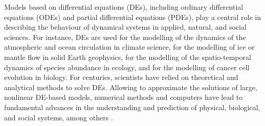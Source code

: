 Models based on differential equations (DEs), including ordinary differential equations (ODEs) and partial differential equations (PDEs), play a central role in describing the behaviour of dynamical systems in applied, natural, and social sciences.
For instance, DEs are used for the modelling of the dynamics of the atmospheric and ocean circulation in climate science, for the modelling of ice or mantle flow in solid Earth geophysics, for the modelling of the spatio-temporal dynamics of species abundance in ecology, and for the modelling of cancer cell evolution in biology.  
For centuries, scientists have relied on theoretical and analytical methods to solve DEs. 
Allowing to approximate the solutions of large, nonlinear DE-based models, numerical methods and computers have lead to fundamental advances in the understanding and prediction of physical, biological, and social systems, among others \cite{Dahlquist_1985, hey2009, Rude:2018jv}.


